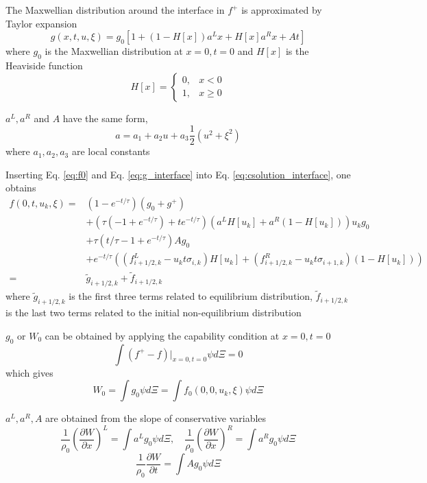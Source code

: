 \documentclass[a4paper]{book}
\begin{document}
The Maxwellian distribution around the interface in $f^+$ is approximated by Taylor expansion
\begin{equation} 
    \label{eq:g_interface}
    g(x,t,u,\xi)=g_0[1+(1-H[x])a^Lx+H[x]a^Rx+At]
\end{equation}
where $g_0$ is the Maxwellian distribution at $x=0,t=0$ and $H[x]$ is the Heaviside function$$H[x]=\begin{cases}0,& x<0\\ 1,& x\geqslant 0\end{cases}$$

$a^L,a^R$ and $A$ have the same form,
$$ a = a_1+a_2u+a_3\frac{1}{2}(u^2+\xi^2)$$
where $a_1,a_2,a_3$ are local constants

Inserting Eq. \ref{eq:f0} and Eq. \ref{eq:g_interface} into Eq. \ref{eq:csolution_interface}, one obtains
\begin{equation} 
    \label{eq:csolution_final}
    \begin{aligned}
        f(0,t,u_k,\xi)=&(1-e^{-t/\tau})(g_0+g^+)\\
                       &+(\tau(-1+e^{-t/\tau})+te^{-t/\tau})(a^LH[u_k]+a^R(1-H[u_k]))u_kg_0\\
                       &+\tau(t/\tau-1+e^{-t/\tau})Ag_0\\
                       &+e^{-t/\tau}((f_{i+1/2,k}^L-u_kt\sigma_{i,k})H[u_k]+(f_{i+1/2,k}^R-u_kt\sigma_{i+1,k})(1-H[u_k]))\\
        =&{\tilde g}_{i+1/2,k}+{\tilde f}_{i+1/2,k}
    \end{aligned}
\end{equation}
where ${\tilde g}_{i+1/2,k}$ is the first three terms related to equilibrium distribution, ${\tilde f}_{i+1/2,k}$ is the last two terms related to the initial non-equilibrium distribution

$g_0$ or $W_0$ can be obtained by applying the capability condition at $x=0,t=0$
$$\int (f^+-f)|_{x=0,t=0}\psi d\Xi=0$$
which gives
\begin{equation} 
    \label{eq:solve_g0}
    W_0=\int g_0\psi d\Xi=\int f_0(0,0,u_k,\xi)\psi d\Xi
\end{equation}

$a^L,a^R,A$ are obtained from the slope of conservative variables
\begin{equation}
    \label{eq:microslope_space}
    \frac{1}{\rho_0}\left(\frac{\partial W}{\partial x}\right)^L=\int a^L g_0\psi d\Xi,\quad \frac{1}{\rho_0}\left(\frac{\partial W}{\partial x}\right)^R=\int a^R g_0\psi d\Xi
\end{equation}
\begin{equation} 
    \label{eq:microslope_time}
    \frac{1}{\rho_0}\frac{\partial W}{\partial t}=\int Ag_0\psi d\Xi
\end{equation}
\end{document}
